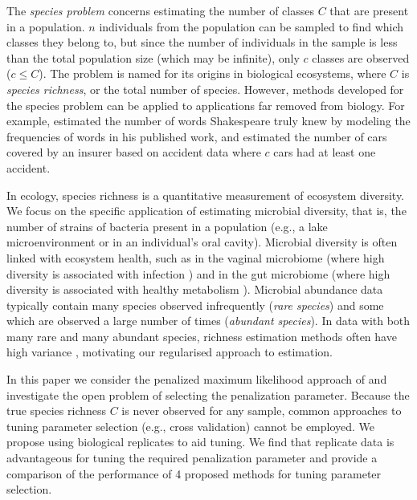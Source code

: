\documentclass[oupdraft]{bio}
\begin{document}
The \textit{species problem} concerns estimating the number of classes $C$ that are present in a population.
$n$ individuals from the population can be sampled to find which classes they belong to, but since the  number of individuals in the sample is less than the total population size (which may be infinite), only $c$ classes are observed ($c \leq C$). The problem is named for its origins in biological ecosystems, where $C$ is \textit{species richness}, or the total number of species.  However, methods developed for the species problem can be applied to applications far removed from biology.  For example, \citet{efron_1976} estimated the number of words Shakespeare truly knew by modeling the frequencies of words in his published work, and  \citet{fegatelli_2018} estimated the number of cars covered by an insurer based on accident data where $c$ cars had at least one accident.

In ecology, species richness is a quantitative measurement of ecosystem diversity.  We focus on the specific application of estimating microbial diversity, that is, the number of strains of bacteria present in a population (e.g., a lake microenvironment or in an individual's oral cavity).
Microbial diversity is often linked with ecosystem health, such as in the vaginal microbiome (where high diversity is associated with infection \citep{Oakley:2008uo}) and in the gut microbiome (where high diversity is associated with healthy metabolism \citep{Morgan:2012bm,Minot:2019hc}).
Microbial abundance data typically contain many species observed infrequently (\textit{rare species}) and some which are observed a large number of times (\textit{abundant species}).  In data with both many rare and many abundant species, richness estimation methods often have high variance \citep{wang_2005,willis_2015}, motivating our regularised approach to estimation.

In this paper we consider the penalized maximum likelihood approach of \citet{wang_2005} and investigate the open problem of selecting the penalization parameter. Because the true species richness $C$ is never observed for any sample, common approaches to tuning parameter selection (e.g., cross validation) cannot be employed. We propose using biological replicates to aid tuning.%
We find that replicate data is advantageous for tuning the required penalization parameter and provide a comparison of the performance of 4 proposed methods for tuning parameter selection.
\end{document}
